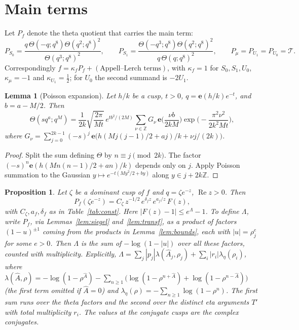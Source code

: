 \documentclass[11pt]{amsart}
\newtheorem{proposition}[theorem]{Proposition}
\newtheorem{lemma}[theorem]{Lemma}
\theoremstyle{definition}
\theoremstyle{remark}
\numberwithin{equation}{section}
\newcommand{\e}{\mathbf{e}}
\newcommand{\Z}{\mathbb{Z}}
\newcommand{\re}{\operatorname{Re}}
\newcommand{\THq}{\mathcal{T}}
\newcommand{\Ahat}{\widehat{A}}
\begin{document}
\section{Main terms}\label{sec:main}

Let $P_f$ denote the theta quotient that carries the main term:
\[
P_{S_0}=\frac{q\,\Theta(-q;q^8)\Theta(q^2;q^8)^2}{\Theta(q^3;q^8)^2},\qquad
P_{S_1}=\frac{\Theta(-q^3;q^8)\Theta(q^2;q^8)^2}{q\,\Theta(q;q^8)^2},\qquad
P_\mu=P_{U_1}=P_{U_0}=\THq.
\]
Correspondingly $f=\kappa_fP_f+(\text{Appell--Lerch terms})$, with $\kappa_f=1$ for $S_0,S_1,U_0$, $\kappa_\mu=-1$ and $\kappa_{U_1}=\frac12$; for $U_0$ the second summand is $-2U_1$.

\begin{lemma}[Poisson expansion]\label{lem:poisson}
Let $h/k$ be a cusp, $t>0$, $q=\e(h/k)e^{-t}$, and $b=a-M/2$.
Then
\[
\Theta(sq^a;q^M)=\frac1{2k}\sqrt{\frac{2\pi}{Mt}}\,e^{tb^2/(2M)}\sum_{\nu\in\Z}G_\nu\,\e\Big(\frac{\nu b}{2kM}\Big)\exp\Big(-\frac{\pi^2\nu^2}{2k^2Mt}\Big),
\]
where $G_\nu=\sum_{j=0}^{2k-1}(-s)^j\,\e\big(h(Mj(j-1)/2+aj)/k+\nu j/(2k)\big)$.
\end{lemma}

\begin{proof}
Split the sum defining $\Theta$ by $n\equiv j\pmod{2k}$.
The factor $(-s)^n\e(h(Mn(n-1)/2+an)/k)$ depends only on $j$.
Apply Poisson summation to the Gaussian $y\mapsto e^{-t(My^2/2+by)}$ along $y\in j+2k\Z$.
\end{proof}

\begin{proposition}\label{prop:main}
Let $\zeta$ be a dominant cusp of $f$ and $q=\zeta e^{-z}$, $\re z>0$.
Then
\[
P_f(\zeta e^{-z})=C_\zeta\,z^{-1/2}\,e^{\delta_f z}\,e^{a_f/z}\,F(z),
\]
with $C_\zeta,a_f,\delta_f$ as in Table~\ref{tab:const}.
Here $|F(z)-1|\le e^{\Lambda}-1$.
To define $\Lambda$, write $P_f$, via Lemmas~\ref{lem:siegel} and~\ref{lem:transf}, as a product of factors $(1-u)^{\pm1}$ coming from the products in Lemma~\ref{lem:bounds}, each with $|u|=\rho_j^{e}$ for some $e>0$.
Then $\Lambda$ is the sum of $-\log(1-|u|)$ over all these factors, counted with multiplicity.
Explicitly, $\Lambda=\sum_j|p_j|\lambda(\Ahat_j,\rho_j)+\sum_i|r_i|\lambda_\eta(\rho_i)$, where $\lambda(\Ahat,\rho)=-\log(1-\rho^{\Ahat})-\sum_{n\ge1}\big(\log(1-\rho^{n+\Ahat})+\log(1-\rho^{n-\Ahat})\big)$ (the first term omitted if $\Ahat=0$) and $\lambda_\eta(\rho)=-\sum_{n\ge1}\log(1-\rho^n)$.
The first sum runs over the theta factors and the second over the distinct eta arguments $T'$ with total multiplicity $r_i$.
The values at the conjugate cusps are the complex conjugates.
\end{proposition}
\end{document}
